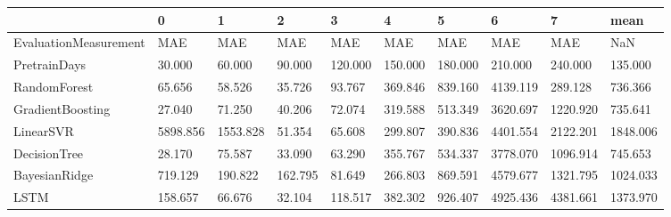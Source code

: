 \begin{tabular}{llllllllll}
\toprule
{} &        0 &        1 &       2 &       3 &       4 &       5 &        6 &        7 &     mean \\
\midrule
EvaluationMeasurement &      MAE &      MAE &     MAE &     MAE &     MAE &     MAE &      MAE &      MAE &      NaN \\
PretrainDays          &   30.000 &   60.000 &  90.000 & 120.000 & 150.000 & 180.000 &  210.000 &  240.000 &  135.000 \\
RandomForest          &   65.656 &   58.526 &  35.726 &  93.767 & 369.846 & 839.160 & 4139.119 &  289.128 &  736.366 \\
GradientBoosting      &   27.040 &   71.250 &  40.206 &  72.074 & 319.588 & 513.349 & 3620.697 & 1220.920 &  735.641 \\
LinearSVR             & 5898.856 & 1553.828 &  51.354 &  65.608 & 299.807 & 390.836 & 4401.554 & 2122.201 & 1848.006 \\
DecisionTree          &   28.170 &   75.587 &  33.090 &  63.290 & 355.767 & 534.337 & 3778.070 & 1096.914 &  745.653 \\
BayesianRidge         &  719.129 &  190.822 & 162.795 &  81.649 & 266.803 & 869.591 & 4579.677 & 1321.795 & 1024.033 \\
LSTM                  &  158.657 &   66.676 &  32.104 & 118.517 & 382.302 & 926.407 & 4925.436 & 4381.661 & 1373.970 \\
\bottomrule
\end{tabular}
